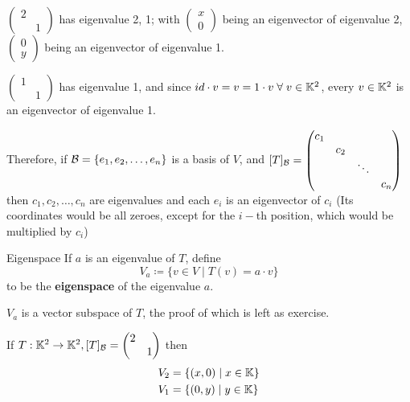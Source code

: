 \begin{example}
    \(\begin{pmatrix}
        2 &   \\
          & 1
    \end{pmatrix}\) has eigenvalue 2, 1; with \(\begin{pmatrix}
        x \\ 0
    \end{pmatrix}\) being an eigenvector of eigenvalue 2, \(\begin{pmatrix}
        0 \\
        y
    \end{pmatrix}\) being an eigenvector of eigenvalue 1.

    \(\begin{pmatrix}
        1 &   \\
          & 1
    \end{pmatrix}\) has eigenvalue 1, and since \(id \cdot v = v = 1 \cdot v \forall v \in \bbk^2\), every \(v \in \mathbb{K}^2\) is an eigenvector of eigenvalue 1.
\end{example}

Therefore, if \(\mathcal{B} = \{e_1, e_2, \ldots, e_n\}\) is a basis of \(V\), and \([T]_{\mathcal{B}} = \begin{pmatrix}
    c_1 &     &        &     \\
        & c_2 &        &     \\
        &     & \ddots &     \\
        &     &        & c_n
\end{pmatrix}\) then \(c_1, c_2, \ldots, c_n\) are eigenvalues and each \(e_i\) is an eigenvector of \(c_i\) (Its coordinates would be all zeroes, except for the \(i-\)th position, which would be multiplied by \(c_i\))

\begin{definition} {Eigenspace}
    If \(a\) is an eigenvalue of \(T\), define \[
        V_a \coloneqq \{v \in V \mid T(v) = a\cdot v\}
    \]
    to be the \textbf{eigenspace} of the eigenvalue \(a\).
\end{definition}

\begin{claim}
    \(V_a\) is a vector subspace of \(T\), the proof of which is left as exercise.
\end{claim}

\begin{example}
    If \(T: \mathbb{K}^2 \to \mathbb{K}^2, [T]_{\mathcal{B}} = \begin{pmatrix}
        2 &   \\
          & 1
    \end{pmatrix}\) then \begin{align*}
        V_2 & = \{(x, 0) \mid x \in \mathbb{K}\} \\
        V_1 & = \{(0, y) \mid y \in \mathbb{K}\}
    \end{align*}
\end{example}


